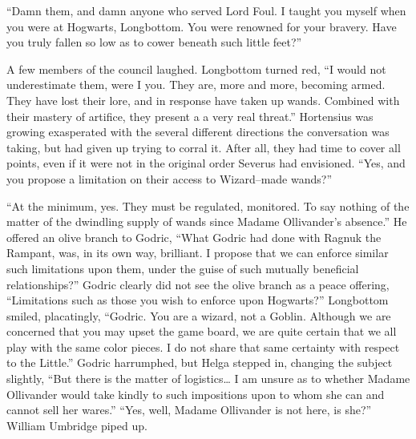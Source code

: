 “Damn them, and damn anyone who served Lord Foul. I taught you myself when you were at Hogwarts, Longbottom. You were renowned for your bravery. Have you truly fallen so low as to cower beneath such little feet?”

A few members of the council laughed. Longbottom turned red, “I would not underestimate them, were I you. They are, more and more, becoming armed. They have lost their lore, and in response have taken up wands. Combined with their mastery of artifice, they present a a very real threat.”
\SmallVSpace
Hortensius was growing exasperated with the several different directions the conversation was taking, but had given up trying to corral it. After all, they had time to cover all points, even if it were not in the original order Severus had envisioned. “Yes, and you propose a limitation on their access to Wizard\mbox{--}made wands?”

“At the minimum, yes. They must be regulated, monitored. To say nothing of the matter of the dwindling supply of wands since Madame Ollivander’s absence.” He offered an olive branch to Godric, “What Godric had done with Ragnuk the Rampant, was, in its own way, brilliant. I propose that we can enforce similar such limitations upon them, under the guise of such mutually beneficial relationships?”
\SmallVSpace
Godric clearly did not see the olive branch as a peace offering, “Limitations such as those you wish to enforce upon Hogwarts?”
\SmallVSpace
Longbottom smiled, placatingly, “Godric. You are a wizard, not a Goblin. Although we are concerned that you may upset the game board, we are quite certain that we all play with the same color pieces. I do not share that same certainty with respect to the Little.”
\SmallVSpace
Godric harrumphed, but Helga stepped in, changing the subject slightly, “But there is the matter of logistics… I am unsure as to whether Madame Ollivander would take kindly to such impositions upon to whom she can and cannot sell her wares.”
\SmallVSpace
“Yes, well, Madame Ollivander is not here, is she?” William Umbridge piped up.

